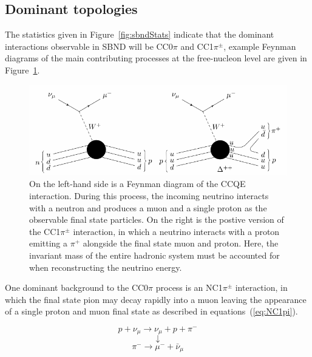 \subsection{Dominant topologies}

The statistics given in Figure~\ref{fig:sbndStats} indicate that the dominant interactions observable in SBND will be CC0$\pi$ and CC1$\pi ^{\pm}$, example Feynman diagrams of the main contributing processes at the free-nucleon level are given in Figure~\ref{fig:feyn}. 

    \begin{figure}[h!]
        \includegraphics[width=\textwidth]{images/feynmans.pdf}
        \caption{On the left-hand side is a Feynman diagram of the CCQE interaction. During this process, the incoming neutrino interacts with a neutron and produces a muon and a single proton as the observable final state particles. On the right is the postive version of the CC1$\pi ^{\pm}$ interaction, in which a neutrino interacts with a proton emitting a $\pi ^{+}$ alongside the final state muon and proton. Here, the invariant mass of the entire hadronic system must be accounted for when reconstructing the neutrino energy.}
        \label{fig:feyn}
    \end{figure}

One dominant background to the CC0\(\pi\) process is an NC1\(\pi^{\pm}\) interaction, in which the final state pion may decay rapidly into a muon leaving the appearance of a single proton and muon final state as described in equations~(\ref{eq:NC1pi}).

    \begin{equation}
        p + \nu_{\mu} \longrightarrow \nu_{\mu} + p + \pi^{-}
    \end{equation}
    \begin{equation}\label{eq:NC1pi}
        \downarrow
    \end{equation}
    \begin{equation}
        \pi^{-} \longrightarrow \mu^{-} + \bar{\nu}_{\mu}
    \end{equation}

